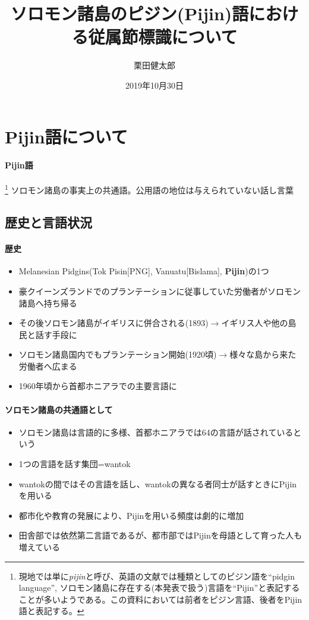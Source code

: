 \documentclass[11pt,a4paper]{jsarticle}
\title{\fontsize{16pt}{0pt}\selectfont ソロモン諸島のピジン(Pijin)語における従属節標識について}
\author{栗田健太郎}
\date{2019年10月30日}
\begin{document}
\maketitle
\section{Pijin語について}
\paragraph{Pijin語}\footnote{現地では単に\textit{pijin}と呼び、英語の文献では種類としてのピジン語を``pidgin language'', ソロモン諸島に存在する(本発表で扱う)言語を``Pijin''と表記することが多いようである。この資料においては前者をピジン言語、後者をPijin語と表記する。} ソロモン諸島の事実上の共通語。公用語の地位は与えられていない話し言葉

\subsection{歴史と言語状況}
\cite{phonology}
\paragraph{歴史}
\begin{itemize}
  \item Melanesian Pidgins(Tok Pisin[PNG], Vanuatu[Bislama], \textbf{Pijin})の1つ
  \item 豪クイーンズランドでのプランテーションに従事していた労働者がソロモン諸島へ持ち帰る
  \item その後ソロモン諸島がイギリスに併合される(1893)$\rightarrow$イギリス人や他の島民と話す手段に
  \item ソロモン諸島国内でもプランテーション開始(1920頃)$\rightarrow$様々な島から来た労働者へ広まる
  \item 1960年頃から首都ホニアラでの主要言語に
\end{itemize}

\paragraph{ソロモン諸島の共通語として}
\begin{itemize}
  \item ソロモン諸島は言語的に多様、首都ホニアラでは64の言語が話されているという
  \item 1つの言語を話す集団=wantok
  \item wantokの間ではその言語を話し、wantokの異なる者同士が話すときにPijinを用いる
  \item 都市化や教育の発展により、Pijinを用いる頻度は劇的に増加
  \item 田舎部では依然第二言語であるが、都市部ではPijinを母語として育った人も増えている
\end{itemize}
\end{document}
